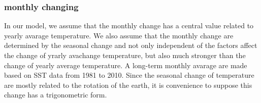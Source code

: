 \documentclass{mcmthesis}
\begin{document}
    \begin{figure}[htbp]
      \centering
      
      \centering
      \caption{}
    \end{figure}
  \subsubsection{monthly changing}
    In our model, we assume that the monthly change has a central value related to yearly avarage temperature. We also assume that the monthly change are determined by the seasonal change and not only independent of the factors affect the change of yrarly avachange temperature, but also much stronger than the change of yearly average temperature. 
    A long-term monthly avarage are made based on SST data from 1981 to 2010. Since the seasonal change of temperature are mostly related to the rotation of the earth, it is convenience to suppose this change has a trigonometric form. 
\end{document}
